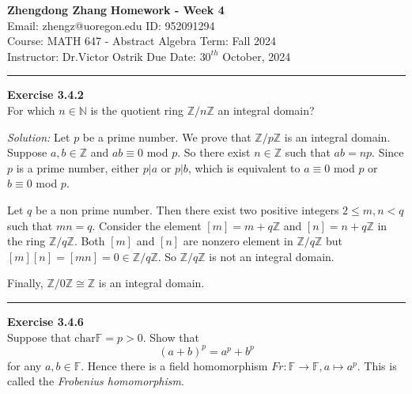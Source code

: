 \documentclass[a4paper, 12pt]{article}
\newenvironment{problem}[2][Exercise]
    { \begin{mdframed}[backgroundcolor=gray!20] \textbf{#1 #2} \\}
    {  \end{mdframed}}
\newenvironment{solution}
    {\textit{Solution:}}
    {}
\begin{document}
\noindent
\large\textbf{Zhengdong Zhang} \hfill \textbf{Homework - Week 4}   \\
Email: zhengz@uoregon.edu \hfill ID: 952091294 \\
\normalsize Course: MATH 647 - Abstract Algebra  \hfill Term: Fall 2024\\
Instructor: Dr.Victor Ostrik \hfill Due Date: $30^{th}$ October, 2024 \\
\noindent\rule{7in}{2.8pt}
\begin{problem}{3.4.2}
For which \(n\in \mathbb{N}\) is the quotient ring \(\mathbb{Z}/n \mathbb{Z}\) an integral domain?
\end{problem}
\begin{solution}
Let \(p\) be a prime number. We prove that \(\mathbb{Z}/p \mathbb{Z}\) is an integral domain. Suppose \(a,b\in \mathbb{Z}\) and \(ab\equiv 0\) mod \(p\). So 
there exist \(n\in \mathbb{Z}\) such that \(ab=np\). Since \(p\) is a prime number, either \(p|a\) or \(p|b\), which is equivalent to \(a\equiv 0\) mod \(p\) or 
\(b\equiv 0\) mod \(p\). 
\par 
Let \(q\) be a non prime number. Then there exist two positive integers \(2\leq m,n<q\) such that \(mn=q\). Consider the element \([m]=m+q\mathbb{Z}\) and \([n]=n+q \mathbb{Z}\) in the ring 
\(\mathbb{Z}/ q \mathbb{Z}\). Both \([m]\) and \([n]\) are nonzero element in \(\mathbb{Z}/q \mathbb{Z}\) but \([m][n]=[mn]=0\in \mathbb{Z}/q \mathbb{Z}\). So \(\mathbb{Z}/q \mathbb{Z}\) is not 
an integral domain.
\par 
Finally, \(\mathbb{Z}/0 \mathbb{Z}\cong \mathbb{Z}\) is an integral domain.
\end{solution}
\\ 
\noindent\rule{7in}{2.8pt}
\begin{problem}{3.4.6}
Suppose that \(\text{char}\mathbb{F}=p>0\). Show that 
$$(a+b)^p=a^p+b^p$$
for any \(a,b\in \mathbb{F}\). Hence there is a field homomorphism \(Fr:\mathbb{F}\rightarrow \mathbb{F},a\mapsto a^p\). This is called the \textit{Frobenius homomorphism}.
\end{problem}
\end{document}
